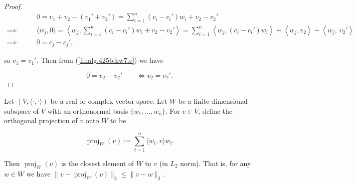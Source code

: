 \begin{proof}
\begin{align}
& 0 = v_1 + v_2 - (v_1' + v_2') =  \sum_{i=1}^n \left(  c_i  - c_i'   \right)  w_i + v_2 - v_2' \label{linalg.425b.hw7.e}
\\ \implies \qquad & \langle w_j, 0 \rangle = \left\langle w_j, \sum_{i=1}^n \left(  c_i  - c_i'   \right)  w_i + v_2 - v_2'  \right \rangle 
=  \sum_{i=1}^n \left\langle w_j, \left(  c_i  - c_i'   \right)  w_i  \right \rangle +\left\langle w_j, v_2  \right \rangle -  \left\langle w_j, \ v_2'  \right \rangle \nonumber
\\ \implies \qquad & 0 = c_j - c_j', \nonumber
\end{align} 

so \(v_1 = v_1'\). Then from (\ref{linalg.425b.hw7.e}) we have


\[
0 = v_2 - v_2' \qquad \iff v_2 = v_2'.
\]





\end{proof}

\begin{theorem}

Let \((V, \langle \cdot, \cdot \rangle)\) be a real or complex vector space. Let \(W\) be a finite-dimensional subspace of \(V\) with an orthonormal basis \(\{w_1, \ldots, w_n\}\). For \(v \in V\), define the orthogonal projection of \(v\) onto \(W\) to be

\[
\operatorname{proj}_W(v) :=  \sum_{i=1}^n \langle w_i, v \rangle w_i.
\] 

Then \( \operatorname{proj}_W(v)\) is the closest element of \(W\) to \(v\) (in \(L_2\) norm). That is, for any \(w \in W\) we have \(\lVert v -  \operatorname{proj}_W(v) \rVert_2 \leq  \lVert v - w \rVert_2 \).

\end{theorem}

